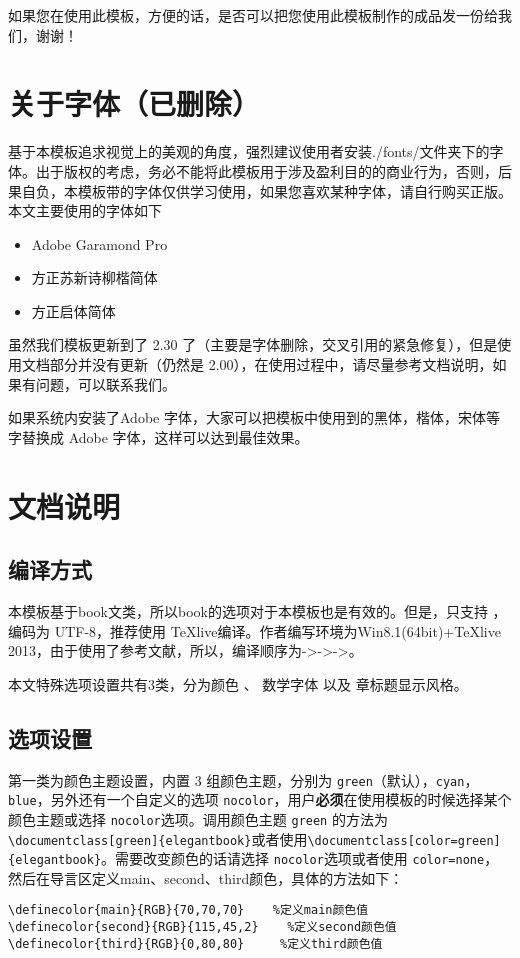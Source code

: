 \documentclass[mathpazo,titlestyle=hang,11pt]{elegantbook}
\begin{document}
如果您在使用此模板，方便的话，是否可以把您使用此模板制作的成品发一份给我们，谢谢！

\section{关于字体（已删除）}

基于本模板追求视觉上的美观的角度，强烈建议使用者安装./fonts/文件夹下的字体。出于版权的考虑，务必不能将此模板用于涉及盈利目的的商业行为，否则，后果自负，本模板带的字体仅供学习使用，如果您喜欢某种字体，请自行购买正版。本文主要使用的字体如下

\begin{itemize}
\itemsep=3pt
\parskip=0pt
\item Adobe Garamond Pro
\item 方正苏新诗柳楷简体
\item 方正启体简体
\end{itemize}

\begin{note}
虽然我们模板更新到了 2.30 了（主要是字体删除，交叉引用的紧急修复），但是使用文档部分并没有更新（仍然是 2.00），在使用过程中，请尽量参考文档说明，如果有问题，可以联系我们。

如果系统内安装了Adobe 字体，大家可以把模板中使用到的黑体，楷体，宋体等字替换成 Adobe 字体，这样可以达到最佳效果。
\end{note}

\section{文档说明}
\subsection{编译方式}
本模板基于book文类，所以book的选项对于本模板也是有效的。但是，只支持 \XeLaTeX{}，编码为 UTF-8，推荐使用 \TeX{}live编译。作者编写环境为Win8.1(64bit)+\TeX{}live 2013，由于使用了参考文献，所以，编译顺序为\XeLaTeX->\BibTeX->\XeLaTeX->\XeLaTeX。

本文特殊选项设置共有3类，分为{\color{main}颜色} 、{\color{main} 数学字体 }以及{\color{main} 章标题显示风格}。

\subsection{选项设置}
第一类为{\color{main}颜色}主题设置，内置 3 组颜色主题，分别为 \verb|green|（默认），\verb|cyan|，\verb|blue|，另外还有一个自定义的选项 \verb|nocolor|，用户\textbf{必须}在使用模板的时候选择某个颜色主题或选择 \verb|nocolor|选项。调用颜色主题 \verb|green| 的方法为\verb|\documentclass[green]{elegantbook}|或者使用\verb|\documentclass[color=green]{elegantbook}|。需要改变颜色的话请选择 \verb|nocolor|选项或者使用 \verb|color=none|，然后在导言区定义main、second、third颜色，具体的方法如下：
\begin{verbatim}
\definecolor{main}{RGB}{70,70,70}    %定义main颜色值
\definecolor{second}{RGB}{115,45,2}    %定义second颜色值
\definecolor{third}{RGB}{0,80,80}     %定义third颜色值
\end{verbatim}
\end{document}
